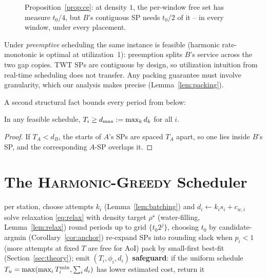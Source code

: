 \begin{figure}[t]
\centering

\caption{Proposition~\ref{prop:ce}: at density $1$, the per-window free set
has measure $t_0/4$, but $B$'s contiguous SP needs $t_0/2$ of it -- in every
window, under every placement.}
\label{fig:ce1}
\end{figure}

\begin{remark}
Under \emph{preemptive} scheduling the same instance is feasible (harmonic
rate-monotonic is optimal at utilization~1): preemption splits $B$'s service
across the two gap copies. TWT SPs are contiguous by design, so utilization
intuition from real-time scheduling does not transfer. Any packing guarantee
must involve granularity, which our analysis makes precise
(Lemma~\ref{lem:packing}).
\end{remark}

A second structural fact bounds every period from below:

\begin{lemma}
\label{lem:longsp}
In any feasible schedule, $T_i \ge d_{\max} := \max_k d_k$ for all $i$.
\end{lemma}

\begin{proof}
If $T_A < d_B$, the starts of $A$'s SPs are spaced $T_A$ apart, so one lies
inside $B$'s SP, and the corresponding $A$-SP overlaps it.
\end{proof}

\section{The \textsc{Harmonic-Greedy} Scheduler}
\label{sec:algorithm}

\begin{algorithm}[t]
\caption{\textsc{Harmonic-Greedy}}
\label{alg:hg}
\begin{algorithmic}[1]
\State per station, choose attempts $k_i$ (Lemma~\ref{lem:batching}) and
$d_i \gets k_i s_i + c_{w,i}$
\State solve relaxation \eqref{eq:relax} with density target $\rho^\star$
(water-filling, Lemma~\ref{lem:relax})
\State round periods up to grid $\{t_0 2^j\}$, choosing $t_0$ by
candidate-argmin (Corollary~\ref{cor:anchor})
\State re-expand SPs into rounding slack when $p_i < 1$ (more attempts at
fixed $T$ are free for AoI)
\State pack by small-first best-fit (Section~\ref{sec:theory}); emit
$(T_i, \phi_i, d_i)$
\State \textbf{safeguard}: if the uniform schedule
$T_u = \max(\max_i T^{\min}_i, \sum_i d_i)$ has lower estimated cost, return it
\end{algorithmic}
\end{algorithm}

